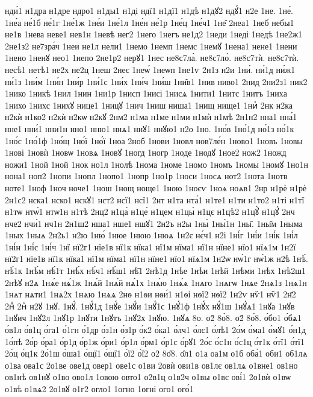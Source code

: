 {нди́1
н1дра
н1дре
ндро1
н1ды1
н1ді
ндї1
н1дї1
н1дѣ
н1дꙋ2
ндꙋ́1
н2е
1не.
1не́.
1не́а
не́1б
не́1г
1не́1ж
1не́и
1не́1л
1не́н
не́1р
1не́ц
1не́ч1
1не̑
2неа1
1неб
небы1
не1в
1нева
неве1
нев1н
1невѣ
нег2
1него
1негъ
не1д2
1неди
1неді
1недѣ
1не2ж1
2не1з2
не7зра́ч
1неи
не1л
нели1
1немо
1немп
1немс
1немꙋ
1нена1
нене1
1нени
1нено
1ненꙋ
нео1
1непо
2не1р2
нерꙋ1
1нес
не8с7ла̀.
не8с7ло̀.
не8с7тѝ.
не8с7тѝ.
несѣ1
нетѣ1
не2х
не2ц
1неш
2неє
1неѡ́
1неѡп
1не1ѵ
2н1з
н2и
1ни́.
ни́1д
ни́ж1
ни́1з
1ни́м
1ни́н
1ни́р
1ни́1с
1ни́х
1ни́ч
1ни́ш
1ни̑в1
1нив
ниво1
2нид
2ни2з1
ник2
1нико
1никѣ
1нил
1нин
1ни1р
1нисп
1нисі
1нисѧ
1нити1
1нитс
1нитъ
1ниха
1нихо
1нихс
1нихꙋ
нице1
1ницꙋ
1нич
1ниш
ниша1
1нищ
нище1
1ниⷯ
2нк
н2ка
н2кѝ
н1ко2
н2кѝ
н2кѡ
н2кꙋ
2нм2
н1ма
н1ме
н1ми
н1мѝ
н1мѣ
2н1н2
нна1
нна́1
нне1
нни́1
нни1н
нно1
нню1
ннѧ1
ннꙋ1
ннꙋю1
н2о
1но.
1но́в
1но́1д
но́1з
но́1к
1но́с
1но́1ф
1но́щ
1но́ї
1но́ї
1ноа
2ноб
1нови
1новл
нов7ле́н
1ново1
1новъ
1новы
1нові
1новѝ
1новѡ
1новѧ
1новꙋ
1ногд
1ногр
1ноде
1нодꙋ
1ное2
нож2
1ножд
ножи1
1ной
1ной
1нок
но1л
1нолѣ
1нома
1номе
1номо
1номъ
1номы
1номꙋ
1но1н
нона1
ноп2
1нопи
1нопл
1нопо1
1нопр
1но1р
1носи
1носѧ
нот2
1нота
1нотв
ноте1
1ноф
1ноч
ноче1
1нош
1нощ
ноще1
1ною
1ноєѵ
1ноѧ
ноѧв1
2нр
н1рѐ
н1рѐ
2н1с2
нска1
нско1
нскꙋ1
нст2
нсї1
нсї1
2нт
н1та
нта́1
н1те1
н1ти
н1то2
н1ті
н1тї
н1тѡ
нтѡ́1
нтѡ1н
н1тѣ
2нц2
н1ца̀
н1це́
н1цем
н1цы̀
н1цє
н1цѣ2
н1цꙋ̀
н1цꙋ́
2нч
нче2
нчи́1
нч1н
2н1ш2
нша1
нше1
ншꙋ1
2н2ъ
н2ы
1ны̀
1ны́1н
1ны̑.
1ны̑м
1ныма
1ных
1ныѧ
2н2ь1
н2ю
1ню́
1нюе
1нюю
1нюѧ
1н2є
нє́ч1
н2і
1ні́г
1ні́и
1ні́к
1ні́л
1ні́н
1ні́с
1ні́ч
1нї
нї2г1
нїе1в
нї1к
нїка1
нї1м
нїма1
нї1н
нїне1
нїо1
нїѧ1м
1н2ї
нї2г1
нїе1в
нї1к
нїка1
нї1м
нїма1
нї1н
нїне1
нїо1
нїѧ1м
1н2ѡ
нѡ́1г
нѡ́1ж
н2ѣ
1нѣ́.
нѣ́1к
1нѣ́м
нѣ́1т
1нѣ́х
нѣ́ч1
нѣ́ш1
нѣ̑1
2нѣ1д
1нѣе
1нѣи
1нѣй
1нѣми
1нѣх
1нѣ2ш1
2нѣꙋ
н2ѧ
1нѧ́е
нѧ́1ж
1нѧ́й
1нѧ́й
нѧ́1х
1нѧ́ю
1нѧ́ѧ
1нѧго
1нѧгѡ
1нѧе
2нѧ1з
1нѧ1н
1нѧт
нѧти1
1нѧ2х
1нѧю
1нѧѧ
2нѳ
н1ѳи
нѳи́1
н1ѳі
нѳї2
нѳї2
1н2ѵ
нѷ1
нѷ1
2н҃2
2нⷣ
2нⷴ
н2ꙋ
1нꙋ.
1нꙋ́.
1нꙋ́1д
1нꙋ́е
1нꙋ́и
1нꙋ́1с
1нꙋ́1ф
1нꙋ́х
нꙋ́1ш
1нꙋ́ѧ1
1нꙋа
1нꙋв
1нꙋич
1нꙋ2л
1нꙋ1р
1нꙋти
1нꙋтъ
1нꙋ2х
1нꙋю.
1нꙋѧ
8о.
о2̀
8о̀8.
о2́
8о́8.
о́бо1
о́бѧ1
о́в1л
о́в1ц
о́га1
о́1гн
о́1др
о́з1н
о́з1р
о́к2
о́ка1
о́лч1
о́лє1
о́лѣ1
2о́м
о́ма1
о́мꙋ1
о́н1д
1о́пѣ
2о́р
о́ра1
о́р1д
о́р1ж
о́ри1
о́р1л
о́рм1
о́р1с
о́рꙋ1
2о́с
о́с1н
о́с1ц
о́т1к
о́тї1
о́тї1
2о́ц
о́ц1к
2о́1ш
о́ша1
о́щї1
о́щї1
о́ї2
о́ї2
о2̑
8о̑8.
о̑л1
о1а
оа1м
о1б
оба́1
оби1
об1лѧ
о1ва
ова1с
2о1ве
ове1д
овер1
ове1с
о1ви
2овѝ
ови1в
ов1лє
ов1лѧ
о1вне1
ов1но
ов1нѣ
ов1нꙋ
о1во
ово1л
1овою
овто1
о2в1ц
о1в2ч
о1вы
о1вє
ові́1
2о1вѝ
о1вѡ
о1вѣ
о1вѧ2
2о1вꙋ
о1г2
огло1
1огно
1огні
ого1
ого́1
}
